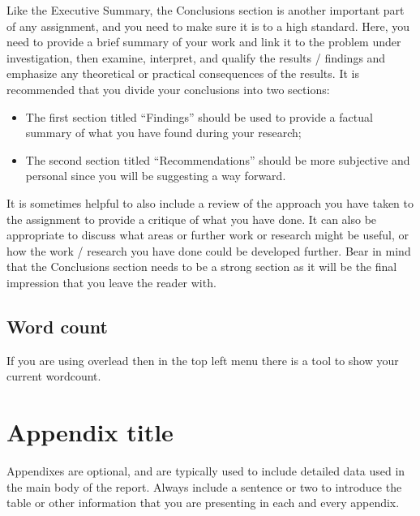 \documentclass{bcrre_assignment}
\begin{document}
Like the Executive Summary, the Conclusions section is another important part of any assignment, and you need to make sure it is to a high standard.  Here, you need to provide a brief summary of your work and link it to the problem under investigation, then examine, interpret, and qualify the results / findings and emphasize any theoretical or practical consequences of the results.  
It is recommended that you divide your conclusions into two sections:
\begin{itemize}
    \item The first section titled “Findings” should be used to provide a factual summary of what you have found during your research;
    \item The second section titled “Recommendations” should be more subjective and personal since you will be suggesting a way forward.
\end{itemize}
It is sometimes helpful to also include a review of the approach you have taken to the assignment to provide a critique of what you have done.  It can also be appropriate to discuss what areas or further work or research might be useful, or how the work / research you have done could be developed further.
Bear in mind that the Conclusions section needs to be a strong section as it will be the final impression that you leave the reader with. 

\section{Word count}
If you are using overlead then in the top left menu there is a tool to show your current wordcount.


\printbibliography

\appendix
\chapter{Appendix title}
Appendixes are optional, and are typically used to include detailed data used in the main body of the report.  Always include a sentence or two to introduce the table or other information that you are presenting in each and every appendix. 
\end{document}
